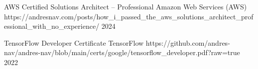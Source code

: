 

\begin{cvhonors}

	\cvhonor%
	{AWS Certified Solutions Architect – Professional} %
	{Amazon Web Services (AWS)} %
	{https://andresnav.com/posts/how_i_passed_the_aws_solutions_architect_professional_with_no_experience/} %
	{2024} %

	\cvhonor%
	{TensorFlow Developer Certificate} %
	{TensorFlow} %
	{https://github.com/andres-nav/andres-nav/blob/main/certs/google/tensorflow_developer.pdf?raw=true} %
	{2022} %

\end{cvhonors}
